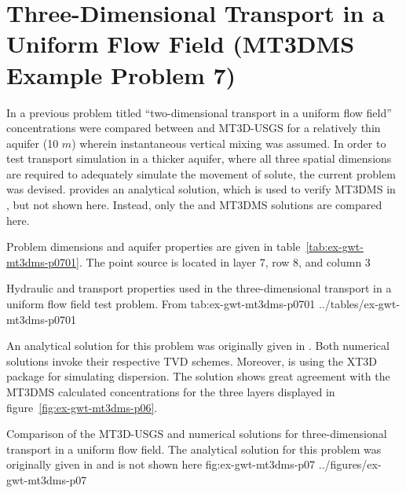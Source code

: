 \section{Three-Dimensional Transport in a Uniform Flow Field (MT3DMS Example Problem 7)}

In a previous problem titled ``two-dimensional transport in a uniform flow field'' concentrations were compared between \mf and MT3D-USGS for a relatively thin aquifer (10 $m$) wherein instantaneous vertical mixing was assumed.  In order to test transport simulation in a thicker aquifer, where all three spatial dimensions are required to adequately simulate the movement of solute, the current problem was devised. \cite{hunt1978} provides an analytical solution, which is used to verify MT3DMS in \cite{zheng1999mt3dms}, but not shown here.  Instead, only the \mf and MT3DMS solutions are compared here. 

Problem dimensions and aquifer properties are given in table~\ref{tab:ex-gwt-mt3dms-p0701}.  The point source is located in layer 7, row 8, and column 3

\begin{StandardTable}
	{Hydraulic and transport properties used in the three-dimensional transport in a uniform flow field test problem.  From \cite{zheng1999mt3dms}}
	{tab:ex-gwt-mt3dms-p0701}
	{../tables/ex-gwt-mt3dms-p0701}
\end{StandardTable}

An analytical solution for this problem was originally given in \cite{hunt1978}.  Both numerical solutions invoke their respective TVD schemes.  Moreover, \mf is using the XT3D package for simulating dispersion.  The \mf solution shows great agreement with the MT3DMS calculated concentrations for the three layers displayed in figure~\ref{fig:ex-gwt-mt3dms-p06}. 

\begin{StandardFigure}
	{Comparison of the MT3D-USGS and \mf numerical solutions for three-dimensional transport in a uniform flow field. The analytical solution for this problem was originally given in \citep{hunt1978} and is not shown here} 
	{fig:ex-gwt-mt3dms-p07}
	{../figures/ex-gwt-mt3dms-p07}
\end{StandardFigure}

